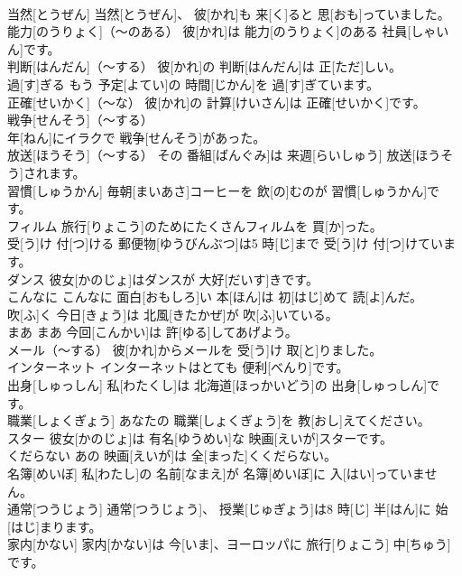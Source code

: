 \documentclass[8pt]{extreport}
\begin{document}
\begin{CJK}{UTF8}{min}
\\	当然[とうぜん]	当然[とうぜん]、 彼[かれ]も 来[く]ると 思[おも]っていました。		
\\	能力[のうりょく]（～のある）	彼[かれ]は 能力[のうりょく]のある 社員[しゃいん]です。		
\\	判断[はんだん]（～する）	彼[かれ]の 判断[はんだん]は 正[ただ]しい。		
\\	過[す]ぎる	もう 予定[よてい]の 時間[じかん]を 過[す]ぎています。		
\\	正確[せいかく]（～な）	彼[かれ]の 計算[けいさん]は 正確[せいかく]です。		
\\	戦争[せんそう]（～する）	
\\	年[ねん]にイラクで 戦争[せんそう]があった。		
\\	放送[ほうそう]（～する）	その 番組[ばんぐみ]は 来週[らいしゅう] 放送[ほうそう]されます。		
\\	習慣[しゅうかん]	毎朝[まいあさ]コーヒーを 飲[の]むのが 習慣[しゅうかん]です。		
\\	フィルム	旅行[りょこう]のためにたくさんフィルムを 買[か]った。		
\\	受[う]け 付[つ]ける	郵便物[ゆうびんぶつ]は5 時[じ]まで 受[う]け 付[つ]けています。		
\\	ダンス	彼女[かのじょ]はダンスが 大好[だいす]きです。		
\\	こんなに	こんなに 面白[おもしろ]い 本[ほん]は 初[はじ]めて 読[よ]んだ。		
\\	吹[ふ]く	今日[きょう]は 北風[きたかぜ]が 吹[ふ]いている。		
\\	まあ	まあ 今回[こんかい]は 許[ゆる]してあげよう。		
\\	メール（～する）	彼[かれ]からメールを 受[う]け 取[と]りました。		
\\	インターネット	インターネットはとても 便利[べんり]です。		
\\	出身[しゅっしん]	私[わたくし]は 北海道[ほっかいどう]の 出身[しゅっしん]です。		
\\	職業[しょくぎょう]	あなたの 職業[しょくぎょう]を 教[おし]えてください。		
\\	スター	彼女[かのじょ]は 有名[ゆうめい]な 映画[えいが]スターです。		
\\	くだらない	あの 映画[えいが]は 全[まった]くくだらない。		
\\	名簿[めいぼ]	私[わたし]の 名前[なまえ]が 名簿[めいぼ]に 入[はい]っていません。		
\\	通常[つうじょう]	通常[つうじょう]、 授業[じゅぎょう]は8 時[じ] 半[はん]に 始[はじ]まります。		
\\	家内[かない]	家内[かない]は 今[いま]、ヨーロッパに 旅行[りょこう] 中[ちゅう]です。		

\end{CJK}
\end{document}
